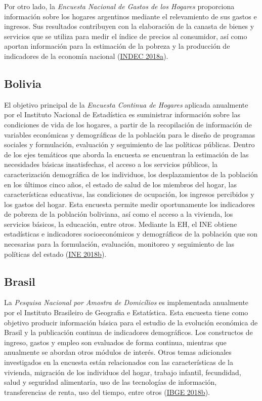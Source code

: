 \documentclass[
  12pt,
  spanish,
]{book}
\begin{document}
Por otro lado, la \emph{Encuesta Nacional de Gastos de los Hogares} proporciona información sobre los hogares argentinos mediante el relevamiento de sus gastos e ingresos. Sus resultados contribuyen con la elaboración de la canasta de bienes y servicios que se utiliza para medir el índice de precios al consumidor, así como aportan información para la estimación de la pobreza y la producción de indicadores de la economía nacional (\protect\hyperlink{ref-INDEC-AR2}{INDEC 2018a}).

\hypertarget{bolivia}{%
\subsection*{Bolivia}\label{bolivia}}

El objetivo principal de la \emph{Encuesta Continua de Hogares} aplicada anualmente por el Instituto Nacional de Estadística es suministrar información sobre las condiciones de vida de los hogares, a partir de la recopilación de información de variables económicas y demográficas de la población para le diseño de programas sociales y formulación, evaluación y seguimiento de las políticas públicas. Dentro de los ejes temáticos que aborda la encuesta se encuentran la estimación de las necesidades básicas insatisfechas, el acceso a los servicios públicos, la caracterización demográfica de los individuos, los desplazamientos de la población en los últimos cinco años, el estado de salud de los miembros del hogar, las características educativas, las condiciones de ocupación, los ingresos percibidos y los gastos del hogar. Esta encuesta permite medir oportunamente los indicadores de pobreza de la población boliviana, así como el acceso a la vivienda, los servicios básicos, la educación, entre otros. Mediante la EH, el INE obtiene estadísticas e indicadores socioeconómicos y demográficos de la población que son necesarias para la formulación, evaluación, monitoreo y seguimiento de las políticas del estado (\protect\hyperlink{ref-INE-BO}{INE 2018b}).

\hypertarget{brasil}{%
\subsection*{Brasil}\label{brasil}}

La \emph{Pesquisa Nacional por Amostra de Domicílios} es implementada anualmente por el Instituto Brasileiro de Geografia e Estatística. Esta encuesta tiene como objetivo producir información básica para el estudio de la evolución económica de Brasil y la publicación continua de indicadores demográficos. Los constructos de ingreso, gastos y empleo son evaluados de forma continua, mientras que anualmente se abordan otros módulos de interés. Otros temas adicionales investigados en la encuesta están relacionados con las características de la vivienda, migración de los individuos del hogar, trabajo infantil, fecundidad, salud y seguridad alimentaria, uso de las tecnologías de información, transferencias de renta, uso del tiempo, entre otros (\protect\hyperlink{ref-IBGE-BR_2017}{IBGE 2018b}).
\end{document}
